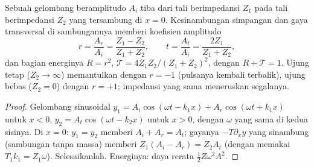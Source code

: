 \begin{proposition}\label{prop:b2:waves-on-strings:junction}
Sebuah gelombang beramplitudo $A_i$ tiba dari tali berimpedansi $Z_1$ pada
tali berimpedansi $Z_2$ yang tersambung di $x = 0$. Kesinambungan
simpangan dan gaya transversal di sambungannya memberi
koefisien amplitudo
\[
r = \frac{A_r}{A_i} = \frac{Z_1 - Z_2}{Z_1 + Z_2} , \qquad
t = \frac{A_t}{A_i} = \frac{2Z_1}{Z_1 + Z_2} ,
\]
dan bagian energinya $R = r^2$, $\mathcal T = 4Z_1Z_2/(Z_1 + Z_2)^2$, dengan
$R + \mathcal T = 1$. Ujung tetap ($Z_2 \to \infty$) memantulkan dengan $r = -1$
(pulsanya kembali terbalik), ujung bebas ($Z_2 = 0$) dengan $r = +1$;
impedansi yang sama meneruskan segalanya.
\end{proposition}

\begin{proof}
Gelombang sinusoidal $y_1 = A_i\cos(\omega t - k_1x) + A_r\cos(\omega t + k_1x)$ untuk
$x < 0$, $y_2 = A_t\cos(\omega t - k_2x)$ untuk $x > 0$, dengan $\omega$ yang sama di kedua
sisinya. Di $x = 0$: $y_1 = y_2$ memberi $A_i + A_r = A_t$; gayanya $-T\partial_xy$
yang sinambung (sambungan tanpa massa) memberi $Z_1(A_i - A_r) = Z_2A_t$ (dengan memakai
$T_1k_1 = Z_1\omega$). Selesaikanlah. Energinya: daya rerata $\tfrac12Z\omega^2A^2$.
\end{proof}


